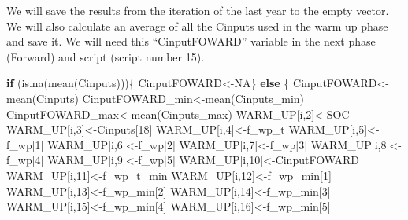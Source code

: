 \documentclass[
  10pt,
  b5paper,
]{book}
\newenvironment{Shaded}{\begin{snugshade}}{\end{snugshade}}
\newcommand{\ConstantTok}[1]{\textcolor[rgb]{0.00,0.00,0.00}{#1}}
\newcommand{\ControlFlowTok}[1]{\textcolor[rgb]{0.13,0.29,0.53}{\textbf{#1}}}
\newcommand{\DecValTok}[1]{\textcolor[rgb]{0.00,0.00,0.81}{#1}}
\newcommand{\FunctionTok}[1]{\textcolor[rgb]{0.00,0.00,0.00}{#1}}
\newcommand{\NormalTok}[1]{#1}
\newcommand{\OtherTok}[1]{\textcolor[rgb]{0.56,0.35,0.01}{#1}}
\begin{document}
We will save the results from the iteration of the last year to the empty vector. We will also calculate an average of all the Cinputs used in the warm up phase and save it. We will need this ``CinputFOWARD'' variable in the next phase (Forward) and script (script number 15).

\begin{Shaded}
\begin{Highlighting}[]
\ControlFlowTok{if}\NormalTok{ (}\FunctionTok{is.na}\NormalTok{(}\FunctionTok{mean}\NormalTok{(Cinputs)))\{ CinputFOWARD}\OtherTok{\textless{}{-}}\ConstantTok{NA}\NormalTok{\} }\ControlFlowTok{else}\NormalTok{ \{ }
\NormalTok{CinputFOWARD}\OtherTok{\textless{}{-}}\FunctionTok{mean}\NormalTok{(Cinputs)}
\NormalTok{CinputFOWARD\_min}\OtherTok{\textless{}{-}}\FunctionTok{mean}\NormalTok{(Cinputs\_min)}
\NormalTok{CinputFOWARD\_max}\OtherTok{\textless{}{-}}\FunctionTok{mean}\NormalTok{(Cinputs\_max)}
\NormalTok{WARM\_UP[i,}\DecValTok{2}\NormalTok{]}\OtherTok{\textless{}{-}}\NormalTok{SOC}
\NormalTok{WARM\_UP[i,}\DecValTok{3}\NormalTok{]}\OtherTok{\textless{}{-}}\NormalTok{Cinputs[}\DecValTok{18}\NormalTok{]}
\NormalTok{WARM\_UP[i,}\DecValTok{4}\NormalTok{]}\OtherTok{\textless{}{-}}\NormalTok{f\_wp\_t}
\NormalTok{WARM\_UP[i,}\DecValTok{5}\NormalTok{]}\OtherTok{\textless{}{-}}\NormalTok{f\_wp[}\DecValTok{1}\NormalTok{]}
\NormalTok{WARM\_UP[i,}\DecValTok{6}\NormalTok{]}\OtherTok{\textless{}{-}}\NormalTok{f\_wp[}\DecValTok{2}\NormalTok{]}
\NormalTok{WARM\_UP[i,}\DecValTok{7}\NormalTok{]}\OtherTok{\textless{}{-}}\NormalTok{f\_wp[}\DecValTok{3}\NormalTok{]}
\NormalTok{WARM\_UP[i,}\DecValTok{8}\NormalTok{]}\OtherTok{\textless{}{-}}\NormalTok{f\_wp[}\DecValTok{4}\NormalTok{]}
\NormalTok{WARM\_UP[i,}\DecValTok{9}\NormalTok{]}\OtherTok{\textless{}{-}}\NormalTok{f\_wp[}\DecValTok{5}\NormalTok{]}
\NormalTok{WARM\_UP[i,}\DecValTok{10}\NormalTok{]}\OtherTok{\textless{}{-}}\NormalTok{CinputFOWARD}
\NormalTok{WARM\_UP[i,}\DecValTok{11}\NormalTok{]}\OtherTok{\textless{}{-}}\NormalTok{f\_wp\_t\_min}
\NormalTok{WARM\_UP[i,}\DecValTok{12}\NormalTok{]}\OtherTok{\textless{}{-}}\NormalTok{f\_wp\_min[}\DecValTok{1}\NormalTok{]}
\NormalTok{WARM\_UP[i,}\DecValTok{13}\NormalTok{]}\OtherTok{\textless{}{-}}\NormalTok{f\_wp\_min[}\DecValTok{2}\NormalTok{]}
\NormalTok{WARM\_UP[i,}\DecValTok{14}\NormalTok{]}\OtherTok{\textless{}{-}}\NormalTok{f\_wp\_min[}\DecValTok{3}\NormalTok{]}
\NormalTok{WARM\_UP[i,}\DecValTok{15}\NormalTok{]}\OtherTok{\textless{}{-}}\NormalTok{f\_wp\_min[}\DecValTok{4}\NormalTok{]}
\NormalTok{WARM\_UP[i,}\DecValTok{16}\NormalTok{]}\OtherTok{\textless{}{-}}\NormalTok{f\_wp\_min[}\DecValTok{5}\NormalTok{]}

\end{Highlighting}
\end{Shaded}
\end{document}
